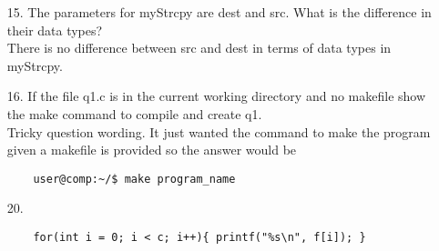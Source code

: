 \documentclass{report}
\begin{document}
\begin{enumerate}
\item[15.]The parameters for myStrcpy are dest and src. What is the difference in their data types?\\
	There is no difference between src and dest in terms of data types in myStrcpy.

\item[16.]If the file q1.c is in the current working directory and no makefile show the make command to compile and create q1.\\
	Tricky question wording. It just wanted the command to make the program given a makefile is provided so the answer would be
	\begin{verbatim}
	user@comp:~/$ make program_name
	\end{verbatim}

\item[20.]
	\begin{verbatim}
	for(int i = 0; i < c; i++){ printf("%s\n", f[i]); }
	\end{verbatim}


\end{enumerate}
\end{document}
